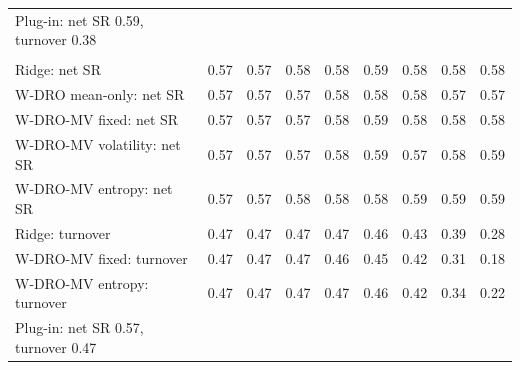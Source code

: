 \begin{tabular}{lrrrrrrrr}
\quad Plug-in: net SR 0.59, turnover 0.38 & \multicolumn{8}{l}{} \\
\addlinespace
\multicolumn{9}{l}{\textit{Gradient Boosting}} \\
\quad Ridge: net SR & 0.57 & 0.57 & 0.58 & 0.58 & 0.59 & 0.58 & 0.58 & 0.58 \\
\quad W-DRO mean-only: net SR & 0.57 & 0.57 & 0.57 & 0.58 & 0.58 & 0.58 & 0.57 & 0.57 \\
\quad W-DRO-MV fixed: net SR & 0.57 & 0.57 & 0.57 & 0.58 & 0.59 & 0.58 & 0.58 & 0.58 \\
\quad W-DRO-MV volatility: net SR & 0.57 & 0.57 & 0.57 & 0.58 & 0.59 & 0.57 & 0.58 & 0.59 \\
\quad W-DRO-MV entropy: net SR & 0.57 & 0.57 & 0.58 & 0.58 & 0.58 & 0.59 & 0.59 & 0.59 \\
\quad Ridge: turnover & 0.47 & 0.47 & 0.47 & 0.47 & 0.46 & 0.43 & 0.39 & 0.28 \\
\quad W-DRO-MV fixed: turnover & 0.47 & 0.47 & 0.47 & 0.46 & 0.45 & 0.42 & 0.31 & 0.18 \\
\quad W-DRO-MV entropy: turnover & 0.47 & 0.47 & 0.47 & 0.47 & 0.46 & 0.42 & 0.34 & 0.22 \\
\quad Plug-in: net SR 0.57, turnover 0.47 & \multicolumn{8}{l}{} \\
\bottomrule
\end{tabular}